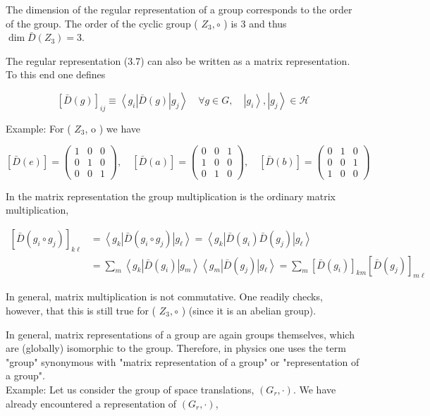 \documentclass[10pt, letterpaper]{article}
\begin{document}
The dimension of the regular representation of a group corresponds to the order of the group. The order of the cyclic group ( $Z_{3}, \circ$ ) is 3 and thus $\operatorname{dim} \bar{D}\left(Z_{3}\right)=3$.

The regular representation (3.7) can also be written as a matrix representation. To this end one defines

$$
[\bar{D}(g)]_{i j} \equiv\left\langle g_{i}\right| \bar{D}(g)\left|g_{j}\right\rangle \quad \forall g \in G, \quad\left|g_{i}\right\rangle,\left|g_{j}\right\rangle \in \mathcal{H}
$$

Example: For ( $Z_{3}$, o ) we have

$$
[\bar{D}(e)]=\left(\begin{array}{ccc}
1 & 0 & 0 \\
0 & 1 & 0 \\
0 & 0 & 1
\end{array}\right), \quad[\bar{D}(a)]=\left(\begin{array}{ccc}
0 & 0 & 1 \\
1 & 0 & 0 \\
0 & 1 & 0
\end{array}\right), \quad[\bar{D}(b)]=\left(\begin{array}{ccc}
0 & 1 & 0 \\
0 & 0 & 1 \\
1 & 0 & 0
\end{array}\right)
$$

In the matrix representation the group multiplication is the ordinary matrix multiplication,

$$
\begin{aligned}
{\left[\bar{D}\left(g_{i} \circ g_{j}\right)\right]_{k \ell} } & =\left\langle g_{k}\right| \bar{D}\left(g_{i} \circ g_{j}\right)\left|g_{\ell}\right\rangle=\left\langle g_{k}\right| \bar{D}\left(g_{i}\right) \bar{D}\left(g_{j}\right)\left|g_{\ell}\right\rangle \\
& =\sum_{m}\left\langle g_{k}\right| \bar{D}\left(g_{i}\right)\left|g_{m}\right\rangle\left\langle g_{m}\right| \bar{D}\left(g_{j}\right)\left|g_{\ell}\right\rangle=\sum_{m}\left[\bar{D}\left(g_{i}\right)\right]_{k m}\left[\bar{D}\left(g_{j}\right)\right]_{m \ell}
\end{aligned}
$$

In general, matrix multiplication is not commutative. One readily checks, however, that this is still true for ( $Z_{3}, \circ$ ) (since it is an abelian group).

In general, matrix representations of a group are again groups themselves, which are (globally) isomorphic to the group. Therefore, in physics one uses the term "group" synonymous with "matrix representation of a group" or "representation of a group".\\
Example: Let us consider the group of space translations, $\left(G_{r}, \cdot\right)$. We have already encountered a representation of $\left(G_{r}, \cdot\right)$,
\end{document}
